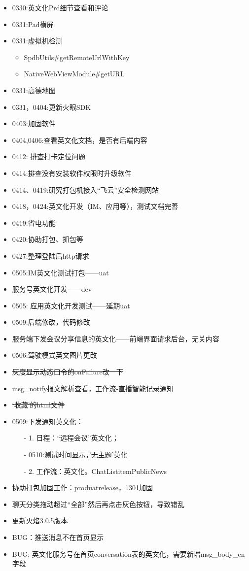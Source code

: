 \documentclass[12pt,a4paper]{ctexart}
\begin{document}
\begin{itemize}
		\item 0330:英文化Prd细节查看和评论
		\item 0331:Pad横屏
		\item 0331:虚拟机检测
		\begin{itemize}
			\item SpdbUtils\#getRemoteUrlWithKey
			\item NativeWebViewModule\#getURL
		\end{itemize}
		\item 0331:高德地图
		\item 0331，0404:更新火眼SDK
		\item 0403:加固软件
		\item 0404,0406:查看英文化文档，是否有后端内容
		\item 0412: 排查打卡定位问题
		\item 0414:排查没有安装软件权限时升级软件
		\item 0414、0419:研究打包机接入“飞云”安全检测网站
		\item 0418，0424:英文化开发（IM、应用等），测试文档完善
		\item \sout{0419:省电功能}
		\item 0420:协助打包、抓包等
		\item 0427:整理登陆后http请求
		\item 0505:IM英文化测试打包——uat
		\item 服务号英文化开发——dev
		\item 0505: 应用英文化开发测试——延期uat
		\item 0509:后端修改，代码修改
		\item 服务端下发会议分享信息的英文化——前端界面请求后台，无关内容
		\item 0506:驾驶模式英文图片更改
		\item \sout{灰度显示动态口令的onFailure改一下}
		\item msg\_notify报文解析查看，工作流-直播\/智能记录通知
		\item \sout{‘收藏’的html文件}
		\item 0509:下发通知英文化：
		\begin{itemize}
			\item[-] 1. 日程：“远程会议”英文化；
			\item[-] 0510:测试时间显示，’无主题’英化
			\item[-]  2. 工作流：英文化。ChatListitemPublicNews
		\end{itemize}
		\item 协助打包加固工作：produatrelease，1301加固
		\item 聊天分类拖动超过“全部”然后再点击灰色按钮，导致错乱
		\item 更新火焰3.0.5版本
		\item BUG：推送消息不在首页显示
		\item BUG:   英文化服务号在首页conversation表的英文化，需要新增msg\_body\_en字段
		\newline
	\end{itemize}
\end{document}
